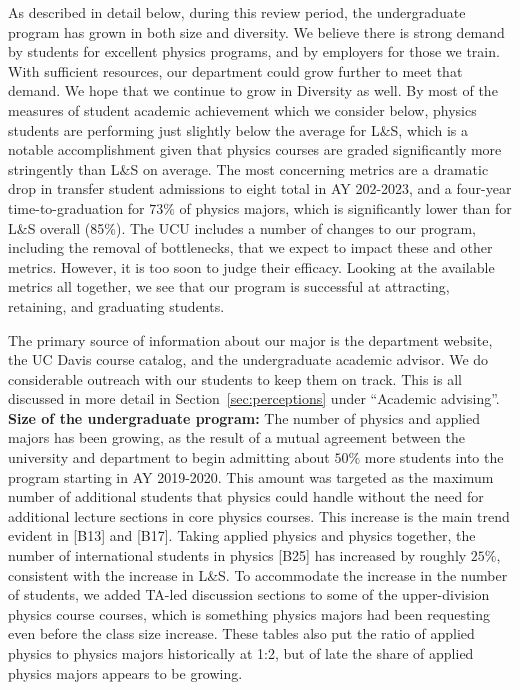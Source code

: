 \documentclass[12pt]{article}
\begin{document}
\noindent
As described in detail below, during this review period, the
undergraduate program has grown in both size and diversity.  We
believe there is strong demand by students for excellent physics
programs, and by employers for those we train.  With sufficient
resources, our department could grow further to meet that demand.  We
hope that we continue to grow in Diversity as well.  By most of the
measures of student academic achievement which we consider below,
physics students are performing just slightly below the average for
L\&S, which is a notable accomplishment given that physics courses are
graded significantly more stringently than L\&S on average.  The most
concerning metrics are a dramatic drop in transfer student admissions
to eight total in AY 202-2023, and a four-year time-to-graduation for
$73\%$ of physics majors, which is significantly lower than for L\&S
overall (85\%).  The UCU includes a number of changes to our program,
including the removal of bottlenecks, that we expect to impact these
and other metrics.  However, it is too soon to judge their efficacy.
Looking at the available metrics all together, we see that our program
is successful at attracting, retaining, and graduating students.

The primary source of information about our major is the department
website, the UC Davis course catalog, and the undergraduate academic
advisor.  We do considerable outreach with our students to keep them
on track.  This is all discussed in more detail in
Section~\ref{sec:perceptions} under ``Academic advising''.\\[3pt]

\noindent
{\bf Size of the undergraduate program:} The number of physics and
applied majors has been growing, as the result of a mutual agreement
between the university and department to begin admitting about $50\%$
more students into the program starting in AY 2019-2020.  This amount
was targeted as the maximum number of additional students that physics
could handle without the need for additional lecture sections in core
physics courses.  This increase is the main trend evident in [B13] and
[B17]. Taking applied physics and physics together, the number of
international students in physics [B25] has increased by roughly
$25\%$, consistent with the increase in L\&S.  To accommodate the
increase in the number of students, we added TA-led discussion
sections to some of the upper-division physics course courses, which
is something physics majors had been requesting even before the class
size increase.  These tables also put the ratio of applied physics to
physics majors historically at 1:2, but of late the share of applied
physics majors appears to be growing.\\[3pt]
\end{document}
